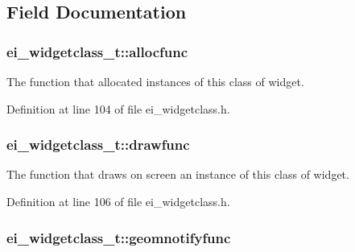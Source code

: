 \subsection{Field Documentation}
\hypertarget{structei__widgetclass__t_a233446250cdde4347c1381427923d21a}{
\subsubsection[{allocfunc}]{ ei\-\_\-widgetclass\-\_\-t\-::allocfunc}}\label{structei__widgetclass__t_a233446250cdde4347c1381427923d21a}


The function that allocated instances of this class of widget. 



Definition at line 104 of file ei\-\_\-widgetclass.\-h.

\hypertarget{structei__widgetclass__t_a528168099a2a1515c4cf65400ccbfff2}{
\subsubsection[{drawfunc}]{ ei\-\_\-widgetclass\-\_\-t\-::drawfunc}}\label{structei__widgetclass__t_a528168099a2a1515c4cf65400ccbfff2}


The function that draws on screen an instance of this class of widget. 



Definition at line 106 of file ei\-\_\-widgetclass.\-h.

\hypertarget{structei__widgetclass__t_aaf0aa3f54a48a6b3f8b8e12574ede4b7}{
\subsubsection[{geomnotifyfunc}]{ ei\-\_\-widgetclass\-\_\-t\-::geomnotifyfunc}}\label{structei__widgetclass__t_aaf0aa3f54a48a6b3f8b8e12574ede4b7}


